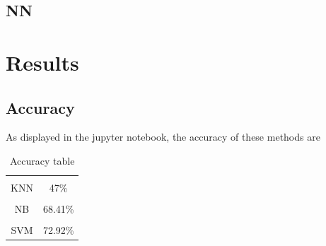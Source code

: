 \documentclass{article}
\begin{document}
 	 \subsection{NN}
	 
	 \section{Results}
	 
	 \subsection{Accuracy}
	 
	 As displayed in the jupyter notebook, the accuracy of these methods are
	 \begin{table}[htbp]
	 	\centering  %
	 	\caption{Accuracy table}  %
	 	\label{table1}  %
	 	\begin{tabular}{|c|c|}  
	 		\hline  %
	 		& \\[-6pt]  %
	 		KNN & 47\% \\  %
	 		\hline
	 		& \\[-6pt]  %
	 		NB& 68.41\% \\
	 		\hline
	 		& \\[-6pt]
	 		SVM & 72.92\%\\
	 		\hline
	 	\end{tabular}
	 \end{table}
	
	

	
\end{document}
